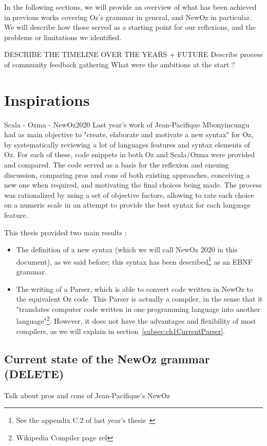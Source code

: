 In the following sections, we will provide an overview of what has been achieved in previous works covering Oz's grammar in general, and NewOz in particular.
We will describe how those served as a starting point for our reflexions, and the problems or limitations we identified.\newline

DESCRIBE THE TIMELINE OVER THE YEARS + FUTURE
Describe process of community feedback gathering
What were the ambitions at the start ?

\section{Inspirations}\label{sec:ch1-2}
Scala - Ozma - NewOz2020
Last year's work of Jean-Pacifique Mbonyincungu had as main objective to "create, elaborate and motivate a new syntax"\cite{jpthesis} for Oz, by systematically reviewing a lot of languages features and syntax elements of Oz.
For each of these, code snippets in both Oz and Scala/Ozma were provided and compared.
The code served as a basis for the reflexion and ensuing discussion, comparing pros and cons of both existing approaches, conceiving a new one when required, and motivating the final choices being made.
The process was rationalized by using a set of objective factors, allowing to rate each choice on a numeric scale in an attempt to provide the best syntax for each language feature.\newline

This thesis provided two main results :
\begin{itemize}
    \item The definition of a new syntax (which we will call NewOz 2020 in this document), as we said before;
    this syntax has been described\footnote{See the appendix C.2 of last year's thesis~\cite{jpthesis}} as an EBNF grammar.
    \item The writing of a Parser, which is able to convert code written in NewOz to the equivalent Oz code.
    This Parser is actually a compiler, in the sense that it "translates computer code written in one programming language into another language"\footnote{Wikipedia Compiler page ref}.
    However, it does not have the advantages and flexibility of most compilers, as we will explain in section~\ref{subsec:ch1CurrentParser}.
\end{itemize}

\subsection{Current state of the NewOz grammar (DELETE)}\label{subsec:ch1CurrentGrammar}
Talk about pros and cons of Jean-Pacifique's NewOz

